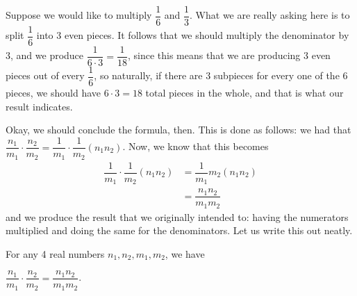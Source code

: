 \documentclass[openany]{book}
\begin{document}
\begin{example}
	Suppose we would like to multiply $\dfrac{1}{6}$ and $\dfrac{1}{3}$. What we are really asking here is to split $\dfrac{1}{6}$ into 3 even pieces. It follows that we should multiply the denominator by 3, and we produce $\dfrac{1}{6\cdot3} = \dfrac{1}{18}$, since this means that we are producing 3 even pieces out of every $\dfrac{1}{6}$, so naturally, if there are 3 subpieces for every one of the 6 pieces, we should have $6\cdot3=18$ total pieces in the whole, and that is what our result indicates.
\end{example}
Okay, we should conclude the formula, then. This is done as follows: we had that $\dfrac{n_{1}}{m_{1}}\cdot\dfrac{n_{2}}{m_{2}} = \dfrac{1}{m_{1}}\cdot\dfrac{1}{m_{2}}(n_{1}n_{2})$. Now, we know that this becomes
\begin{align}
	\dfrac{1}{m_{1}}\cdot\dfrac{1}{m_{2}}(n_{1}n_{2}) &= \dfrac{1}{m_{1}}{m_{2}}(n_{1}n_{2})\\
		&= \dfrac{n_{1}n_{2}}{m_{1}m_{2}}
\end{align}
and we produce the result that we originally intended to: having the numerators multiplied and doing the same for the denominators. Let us write this out neatly.
\begin{formula}
	For any 4 real numbers $n_{1},n_{2},m_{1},m_{2}$, we have
	\begin{center}
		$\dfrac{n_{1}}{m_{1}}\cdot\dfrac{n_{2}}{m_{2}} = \dfrac{n_{1}n_{2}}{m_{1}m_{2}}$.
	\end{center}
\end{formula}
\end{document}
